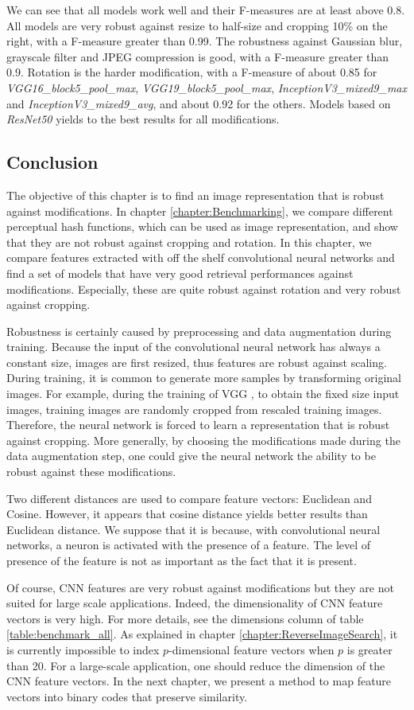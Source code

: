 We can see that all models work well and their F-measures are at least above 0.8. All models are very robust against resize to half-size and cropping 10\% on the right, with a F-measure greater than 0.99. The robustness against Gaussian blur, grayscale filter and JPEG compression is good, with a F-measure greater than 0.9. Rotation is the harder modification, with a F-measure of about 0.85 for \textit{VGG16\_block5\_pool\_max}, \textit{VGG19\_block5\_pool\_max}, \textit{InceptionV3\_mixed9\_max} and \textit{InceptionV3\_mixed9\_avg}, and about 0.92 for the others. Models based on \textit{ResNet50} yields to the best results for all modifications.

\subsection{Conclusion}
The objective of this chapter is to find an image representation that is robust against modifications. In chapter \ref{chapter:Benchmarking}, we compare different perceptual hash functions, which can be used as image representation, and show that they are not robust against cropping and rotation. In this chapter, we compare features extracted with off the shelf convolutional neural networks and find a set of models that have very good retrieval performances against modifications. Especially, these are quite robust against rotation and very robust against cropping. 

Robustness is certainly caused by preprocessing and data augmentation during training. Because the input of the convolutional neural network has always a constant size, images are first resized, thus features are robust against scaling. During training, it is common to generate more samples by transforming original images. For example, during the training of VGG \cite{simonyan2014verydeep}, to obtain the fixed size input images, training images are randomly cropped from rescaled training images. Therefore, the neural network is forced to learn a representation that is robust against cropping. More generally, by choosing the modifications made during the data augmentation step, one could give the neural network the ability to be robust against these modifications.

Two different distances are used to compare feature vectors: Euclidean and Cosine. However, it appears that cosine distance yields better results than Euclidean distance. We suppose that it is because, with convolutional neural networks, a neuron is activated with the presence of a feature. The level of presence of the feature is not as important as the fact that it is present.

Of course, CNN features are very robust against modifications but they are not suited for large scale applications. Indeed, the dimensionality of CNN feature vectors is very high. For more details, see the dimensions column of table \ref{table:benchmark_all}. As explained in chapter \ref{chapter:ReverseImageSearch}, it is currently impossible to index $p$-dimensional feature vectors when $p$ is greater than 20. For a large-scale application, one should reduce the dimension of the CNN feature vectors. In the next chapter, we present a method to map feature vectors into binary codes that preserve similarity.